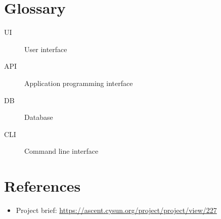 \documentclass{article}
\begin{document}
\section{Glossary}
\begin{description}
  \item[UI] User interface
  \item[API] Application programming interface
  \item[DB] Database
  \item[CLI] Command line interface 
\end{description}

\section{References}
\begin{itemize}
  \item Project brief: \url{https://ascent.cysun.org/project/project/view/227}
\end{itemize}
\end{document}
